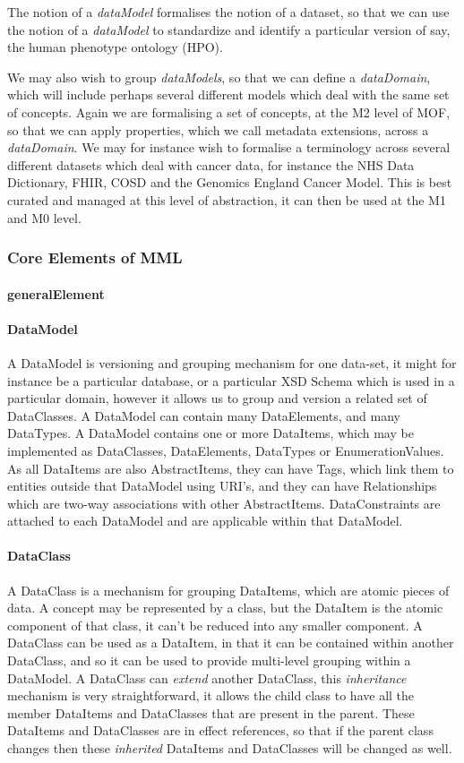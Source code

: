 \documentclass{llncs}
\begin{document}
	The notion of a \emph{dataModel} formalises the notion of a dataset, so that we can use the notion of a \emph{dataModel} to standardize and identify a particular version of say, the human phenotype ontology (HPO). 
	
	We may also wish to group \emph{dataModels}, so that we can define a \emph{dataDomain}, which will include perhaps several different models which deal with the same set of concepts. Again we are formalising a set of concepts, at the M2 level of MOF, so that we can apply properties, which we call metadata extensions, across a \emph{dataDomain}. We may for instance wish to formalise a terminology across several different datasets which deal with cancer data, for instance the NHS Data Dictionary, FHIR, COSD and the Genomics England Cancer Model. This is best curated and managed at this level of abstraction, it can then be used at the M1 and M0 level. 
	
	\subsubsection{Core Elements of MML}
	\paragraph{generalElement}
	
	
	\paragraph{DataModel}
	A DataModel is versioning and grouping mechanism for one data-set, it might for instance be a particular database, or a particular XSD Schema which is used in a particular domain, however it allows us to group and version a related set of DataClasses. A DataModel can contain many DataElements, and many DataTypes. A DataModel contains one or more DataItems, which may be implemented as DataClasses, DataElements, DataTypes or EnumerationValues. As all DataItems are also AbstractItems, they can have Tags, which link them to entities outside that DataModel using URI's, and they can have Relationships which are two-way associations with other AbstractItems. DataConstraints are attached to each DataModel and are applicable within that DataModel.
	\paragraph{DataClass}

	A DataClass is a mechanism for grouping DataItems, which are atomic pieces of data. A concept may be represented by a class, but the DataItem is the atomic component of that class, it can't be reduced into any smaller component. A DataClass can be used as a DataItem, in that it can be contained within another DataClass, and so it can be used to provide multi-level grouping within a DataModel. A DataClass can \emph{extend} another DataClass, this \emph{inheritance} mechanism is very straightforward, it allows the child class to have all the member DataItems and DataClasses that are present in the parent. These DataItems and DataClasses are in effect references, so that if the parent class changes then these \emph{inherited} DataItems and DataClasses will be changed as well.
	
\end{document}
